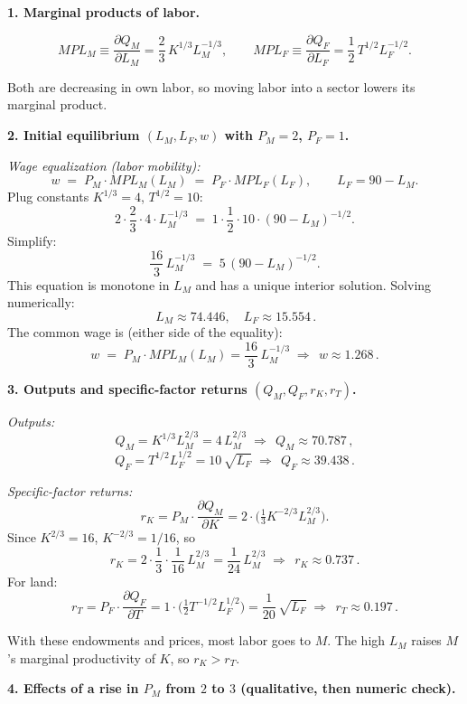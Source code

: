\documentclass[12pt]{article}
\begin{document}
\bigskip

\noindent \textbf{1. Marginal products of labor.}

\[
MPL_M \equiv \frac{\partial Q_M}{\partial L_M} 
= \frac{2}{3}\, K^{1/3} L_M^{-1/3}, 
\qquad
MPL_F \equiv \frac{\partial Q_F}{\partial L_F} 
= \frac{1}{2}\, T^{1/2} L_F^{-1/2}.
\]

\noindent Both are decreasing in own labor, so moving labor into a sector lowers its marginal product.

\bigskip

\noindent \textbf{2. Initial equilibrium $(L_M,L_F,w)$ with $P_M=2$, $P_F=1$.}

\emph{Wage equalization (labor mobility):}
\[
w \;=\; P_M \cdot MPL_M(L_M) \;=\; P_F \cdot MPL_F(L_F), 
\qquad L_F=90-L_M.
\]
Plug constants $K^{1/3}=4$, $T^{1/2}=10$:
\[
2 \cdot \frac{2}{3}\cdot 4 \cdot L_M^{-1/3}
\;=\; 1 \cdot \frac{1}{2}\cdot 10 \cdot (90-L_M)^{-1/2}.
\]
Simplify:
\[
\frac{16}{3} \, L_M^{-1/3} \;=\; 5 \, (90-L_M)^{-1/2}.
\]
This equation is monotone in $L_M$ and has a unique interior solution. Solving numerically:
\[
\boxed{\,L_M \approx 74.446,\quad L_F \approx 15.554\,}.
\]
The common wage is (either side of the equality):
\[
w \;=\; P_M \cdot MPL_M(L_M)
= \frac{16}{3}\, L_M^{-1/3}
\;\Rightarrow\;
\boxed{\,w \approx 1.268\,}.
\]

\bigskip

\noindent \textbf{3. Outputs and specific-factor returns $(Q_M,Q_F,r_K,r_T)$.}

\emph{Outputs:}
\[
Q_M = K^{1/3} L_M^{2/3} = 4\,L_M^{2/3} \;\Rightarrow\; \boxed{\,Q_M \approx 70.787\,},
\]
\[
Q_F = T^{1/2} L_F^{1/2} = 10\,\sqrt{L_F} \;\Rightarrow\; \boxed{\,Q_F \approx 39.438\,}.
\]

\emph{Specific-factor returns:}
\[
r_K = P_M \cdot \frac{\partial Q_M}{\partial K}
= 2 \cdot \Big(\tfrac{1}{3} K^{-2/3} L_M^{2/3}\Big).
\]
Since $K^{2/3}=16$, $K^{-2/3}=1/16$, so
\[
r_K = 2 \cdot \frac{1}{3}\cdot \frac{1}{16} \, L_M^{2/3}
= \frac{1}{24}\, L_M^{2/3}
\;\Rightarrow\; \boxed{\,r_K \approx 0.737\,}.
\]
For land:
\[
r_T = P_F \cdot \frac{\partial Q_F}{\partial T}
= 1 \cdot \Big( \tfrac{1}{2} T^{-1/2} L_F^{1/2} \Big)
= \frac{1}{20}\, \sqrt{L_F}
\;\Rightarrow\; \boxed{\,r_T \approx 0.197\,}.
\]

\noindent With these endowments and prices, most labor goes to $M$. The high $L_M$ raises $M$'s marginal productivity of $K$, so $r_K>r_T$.

\bigskip
\newpage
\noindent \textbf{4. Effects of a rise in $P_M$ from $2$ to $3$ (qualitative, then numeric check).}
\end{document}
